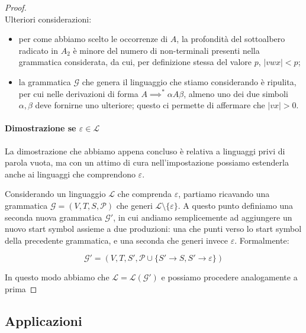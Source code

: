 \documentclass[class=book, crop=false, oneside, 12pt]{standalone}
\begin{document}
\begin{proof}
\begin{equation*}
  \end{equation*}
  Ulteriori considerazioni:
   \begin{itemize}
     \item per come abbiamo scelto le occorrenze di \(A\), la profondità del sottoalbero radicato in \(A_2\) è minore del numero di non-terminali presenti nella grammatica considerata, da cui, per definizione stessa del valore \(p\), \(|vwx| < p\);
     \item la grammatica \(\mathcal{G}\) che genera il linguaggio che stiamo considerando è ripulita, per cui nelle derivazioni di forma \(A \implies^* \alpha A \beta\), almeno uno dei due simboli \(\alpha, \beta\) deve fornirne uno ulteriore; questo ci permette di affermare che \(|vx| > 0\).
   \end{itemize}

   \paragraph{Dimostrazione se \(\varepsilon \in \mathcal{L}\)}
   La dimostrazione che abbiamo appena concluso è relativa a linguaggi privi di parola vuota, ma con un attimo di cura nell'impostazione possiamo estenderla anche ai linguaggi che comprendono \(\varepsilon\).

   Considerando un linguaggio \(\mathcal{L}\) che comprenda \(\varepsilon\), partiamo ricavando una grammatica \(\mathcal{G} = (V, T, S, \mathcal{P})\) che generi \(\mathcal{L} \setminus \{\varepsilon\}\). A questo punto definiamo una seconda nuova grammatica \(\mathcal{G}'\), in cui andiamo semplicemente ad aggiungere un nuovo start symbol assieme a due produzioni: una che punti verso lo start symbol della precedente grammatica, e una seconda che generi invece \(\varepsilon\). Formalmente:

   \begin{equation*}
     \mathcal{G}' = (V, T, S', \mathcal{P} \cup \{ S' \rightarrow S, S' \rightarrow \varepsilon \})
   \end{equation*}

   In questo modo abbiamo che \(\mathcal{L} = \mathcal{L(G')}\) e possiamo procedere analogamente a prima

\end{proof}

\subsection{Applicazioni}
\end{document}

